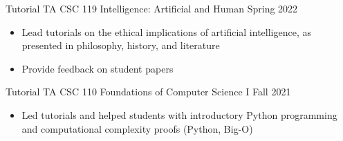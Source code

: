 Tutorial TA CSC 119 Intelligence: Artificial and Human  \hfill Spring 2022\\
\begin{itemize} 
\item Lead tutorials on the ethical implications of artificial intelligence, as presented in philosophy, history, and literature
\item Provide feedback on student papers
\end{itemize} 
 
Tutorial TA CSC 110 Foundations of Computer Science I \hfill Fall 2021\\
\begin{itemize} 
\item Led tutorials and helped students with introductory Python programming and computational complexity proofs (Python, Big-O)
\end{itemize} 